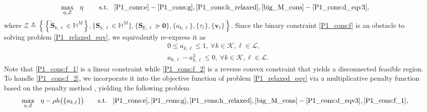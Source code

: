 \documentclass[12pt,draftclsnofoot, onecolumn]{IEEEtran}
\theoremstyle{plain}
\begin{document}
\begin{sloppypar}
\begin{align}
\underset{\eta, \mathcal Z}{\max} \hspace{3mm} \eta \hspace{8mm}
\text{s.t.} \hspace{3mm}  \eqref{P1_cons:e}-\eqref{P1_cons:g}, \eqref{P1_cons:h_relaxed}, \eqref{big_M_cons}-\eqref{P1_cons:d_eqv3}, 
\end{align}
where $\mathcal Z \triangleq \left\lbrace \left\lbrace \tilde{\mathbf S}_{k,\ell} \in \mathbb H^M\right\rbrace, \{\mathbf S_{k,\ell} \in \mathbb H^M\}, \{\mathbf S_{\mathrm E,\ell} \succeq \mathbf 0\}, \{ a_{k,\ell}\}, \{\tau_\ell\},\{\mathbf v_\ell\}\right\rbrace$. Since the binary constraint \eqref{P1_cons:f} is an obstacle to solving problem \eqref{P1_relaxed_eqv}, we equivalently re-express it as 
\begin{subequations}
	\begin{align}
	& 0 \leq a_{k,\ell} \leq 1, \ \forall k\in\mathcal K, \ell \in\mathcal L, \label{P1_cons:f_1}\\
	& a_{k,\ell} - a_{k,\ell}^2 \leq 0, \ \forall k\in\mathcal K, \ell\in\mathcal L. \label{P1_cons:f_2}
	\end{align}
\end{subequations}
Note that \eqref{P1_cons:f_1} is a linear constraint while \eqref{P1_cons:f_2} is a reverse convex constraint that yields a disconnected feasible region. To handle \eqref{P1_cons:f_2}, %
we incorporate it into the objective function of problem \eqref{P1_relaxed_eqv} via a multiplicative penalty function based on the penalty method \cite{2012_Le_penalty}, yielding the following problem
\begin{align}\label{P1_relaxed_eqv2}
\underset{\eta,\mathcal Z}{\max} \hspace{3mm} \eta - \rho h\big(\{a_{k,\ell}\}\big) \hspace{7mm}
\text{s.t.} \hspace{3mm}  \eqref{P1_cons:e}, \eqref{P1_cons:g}, \eqref{P1_cons:h_relaxed}, \eqref{big_M_cons}-\eqref{P1_cons:d_eqv3}, \eqref{P1_cons:f_1}, 
\end{align} 

\end{sloppypar}
\end{document}
